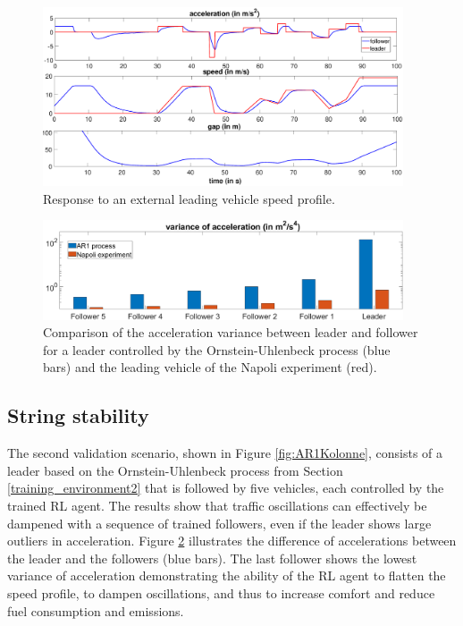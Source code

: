 \documentclass[review]{elsarticle}
\providecommand{\3}{{\ss}}
\begin{document}
	
	
	\begin{figure}
		\centering
		\includegraphics[width=0.95\textwidth]{images/manipulatedLeader.eps}
		\caption{Response to an external leading vehicle speed
			profile.}
		\label{fig:manipulatedLeader}
	\end{figure}
	
	\begin{figure}
		\centering
		\includegraphics[width=0.95\textwidth]{images/VarAccComp}
		\caption{Comparison of the acceleration variance between
			leader and follower for a leader controlled by the Ornstein-Uhlenbeck process (blue
			bars) and the leading vehicle of the Napoli experiment
			(red).}
		\label{fig:VarAccComp}
	\end{figure}
	
	
	
	
	
	
	\subsection{String stability}
	\label{sec:stringStability}
	The second validation scenario, shown in Figure
	\ref{fig:AR1Kolonne}, consists of a leader based on the Ornstein-Uhlenbeck process from Section \ref{training_environment2}
	that is
	followed by five vehicles, each controlled by the trained RL
	agent. The results show that traffic oscillations can effectively be
	dampened with a sequence of trained followers, even if the leader
	shows large outliers in acceleration. Figure \ref{fig:VarAccComp}
	illustrates the difference of accelerations between the leader and the
	followers (blue bars). The last follower shows the lowest variance of
	acceleration demonstrating the ability of the RL agent to
	flatten the speed profile, to dampen oscillations, and thus to increase
	comfort and reduce fuel consumption and emissions.   
	
\end{document}
